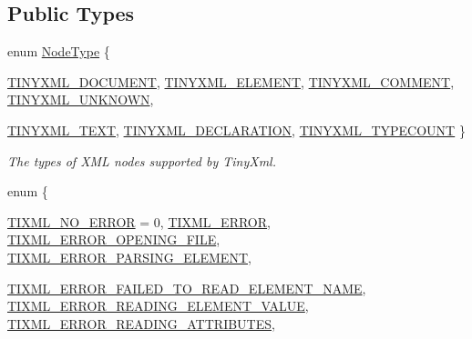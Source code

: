 \subsection*{Public Types}
\begin{DoxyCompactItemize}
\item 
enum \hyperlink{classTiXmlNode_a836eded4920ab9e9ef28496f48cd95a2}{NodeType} \{ \par
\hyperlink{classTiXmlNode_a836eded4920ab9e9ef28496f48cd95a2a76c4c520453398cd033e8b97ec9a0b04}{TINYXML\_\-DOCUMENT}, 
\hyperlink{classTiXmlNode_a836eded4920ab9e9ef28496f48cd95a2a9ad167b17c3148d7a018fde9a41ce976}{TINYXML\_\-ELEMENT}, 
\hyperlink{classTiXmlNode_a836eded4920ab9e9ef28496f48cd95a2a742eb78855db1e81614848072de03721}{TINYXML\_\-COMMENT}, 
\hyperlink{classTiXmlNode_a836eded4920ab9e9ef28496f48cd95a2a7376f9420c8ab507842c8a0813bb077e}{TINYXML\_\-UNKNOWN}, 
\par
\hyperlink{classTiXmlNode_a836eded4920ab9e9ef28496f48cd95a2aa6177e9506461cdca7062559387a2714}{TINYXML\_\-TEXT}, 
\hyperlink{classTiXmlNode_a836eded4920ab9e9ef28496f48cd95a2a1e2351ad8cd0c805538d94222f3d8cd0}{TINYXML\_\-DECLARATION}, 
\hyperlink{classTiXmlNode_a836eded4920ab9e9ef28496f48cd95a2a878567737ed539bd3de6a941027e9309}{TINYXML\_\-TYPECOUNT}
 \}
\begin{DoxyCompactList}\small\item\em The types of XML nodes supported by TinyXml. \item\end{DoxyCompactList}\item 
enum \{ \par
\hyperlink{classTiXmlBase_a9a7e9344415956ab96e8c75f6a0bbd48a750a76ca602241c416d5ec357d55fba1}{TIXML\_\-NO\_\-ERROR} =  0, 
\hyperlink{classTiXmlBase_a9a7e9344415956ab96e8c75f6a0bbd48abcabc1b8efabeda1cc4352aa73d64390}{TIXML\_\-ERROR}, 
\hyperlink{classTiXmlBase_a9a7e9344415956ab96e8c75f6a0bbd48ab803949b8f12e03b5b57f86d9c52b614}{TIXML\_\-ERROR\_\-OPENING\_\-FILE}, 
\hyperlink{classTiXmlBase_a9a7e9344415956ab96e8c75f6a0bbd48a5cbfcf7fe5e67f0cd1aef98deac55dd2}{TIXML\_\-ERROR\_\-PARSING\_\-ELEMENT}, 
\par
\hyperlink{classTiXmlBase_a9a7e9344415956ab96e8c75f6a0bbd48adcc31ca78a9d507a88c9fafb3d18a3c4}{TIXML\_\-ERROR\_\-FAILED\_\-TO\_\-READ\_\-ELEMENT\_\-NAME}, 
\hyperlink{classTiXmlBase_a9a7e9344415956ab96e8c75f6a0bbd48afefdc75db23215e846605a2b5af0c2d3}{TIXML\_\-ERROR\_\-READING\_\-ELEMENT\_\-VALUE}, 
\hyperlink{classTiXmlBase_a9a7e9344415956ab96e8c75f6a0bbd48a670fac23171b64829f90639cc3696d6e}{TIXML\_\-ERROR\_\-READING\_\-ATTRIBUTES}, 

\end{DoxyCompactItemize}
